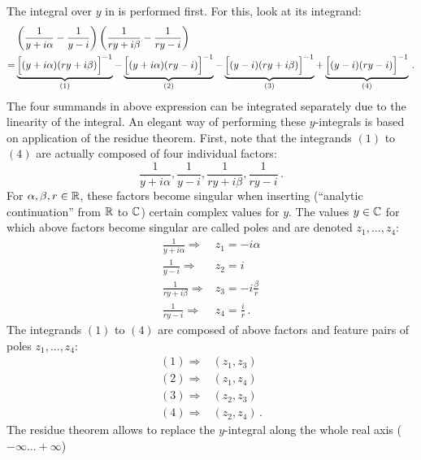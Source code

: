 The integral over $y$ in  is performed first.
For this, look at its integrand:
\begin{align}
  ~& \left( \frac{1}{y + i \alpha} - \frac{1}{y-i} \right) \left( \frac{1}{ry + i \beta} - \frac{1}{ry-i} \right) \nonumber \\
  =&   \underbrace{ \Bigl[ (y + i \alpha) (r y + i \beta) \Bigr]^{-1} }_{(1)}
     - \underbrace{ \Bigl[ (y + i \alpha) (r y - i      ) \Bigr]^{-1} }_{(2)}
     - \underbrace{ \Bigl[ (y - i       ) (r y + i \beta) \Bigr]^{-1} }_{(3)}
     + \underbrace{ \Bigl[ (y - i       ) (r y - i      ) \Bigr]^{-1} }_{(4)} \, . \nonumber
\end{align}
The four summands in above expression can be integrated separately due to the linearity of the integral.
An elegant way of performing these $y$-integrals is based on application of the residue theorem.
First, note that the integrands $(1)$ to $(4)$ are actually composed of four individual factors:
\begin{equation}
 \frac{1}{ y+i \alpha},
 \frac{1}{ y-i},
 \frac{1}{ry+i \beta},
 \frac{1}{ry-i} \, . \nonumber
\end{equation}
For $\alpha, \beta, r \in \mathbb{R}$, these factors become singular when inserting (``analytic continuation'' from $\mathbb{R}$ to $\mathbb{C}$)
certain complex values for $y$. The values $y \in \mathbb{C}$ for which above factors become singular
are called poles and are denoted $z_1, ..., z_4$:
\begin{align}
 \frac{1}{ y+i \alpha} \Rightarrow& z_1 = -i \alpha          \nonumber \\
 \frac{1}{ y-i}        \Rightarrow& z_2 =  i                 \nonumber \\
 \frac{1}{ry+i \beta}  \Rightarrow& z_3 = -i \frac{\beta}{r} \nonumber \\
 \frac{1}{ry-i}        \Rightarrow& z_4 =  \frac{i}{r}       \nonumber \, .
\end{align}
The integrands $(1)$ to $(4)$ are composed of above factors and feature pairs of poles $z_1, ..., z_4$:
\begin{align}
 (1) \Rightarrow& (z_1, z_3) \nonumber \\
 (2) \Rightarrow& (z_1, z_4) \nonumber \\
 (3) \Rightarrow& (z_2, z_3) \nonumber \\
 (4) \Rightarrow& (z_2, z_4) \nonumber \, .
\end{align}
The residue theorem allows to replace the $y$-integral along the whole real axis ($-\infty ... +\infty$)
